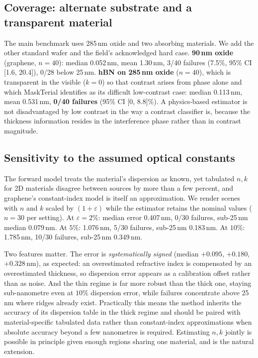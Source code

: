 \documentclass[10pt]{article}
\begin{document}
\subsection{Coverage: alternate substrate and a transparent material}\label{sec:coverage}
The main benchmark uses 285\,nm oxide and two absorbing materials. We add the other standard wafer and the field's acknowledged hard case. \textbf{90\,nm oxide} (graphene, $n{=}40$): median 0.052\,nm, mean 1.30\,nm, 3/40 failures (7.5\%, 95\% CI [1.6, 20.4]), 0/28 below 25\,nm. \textbf{hBN on 285\,nm oxide} ($n{=}40$), which is transparent in the visible ($k{=}0$) so that contrast arises from phase alone and which MaskTerial identifies as its difficult low-contrast case: median 0.113\,nm, mean 0.531\,nm, \textbf{0/40 failures} (95\% CI [0, 8.8]\%). A physics-based estimator is not disadvantaged by low contrast in the way a contrast classifier is, because the thickness information resides in the interference phase rather than in contrast magnitude.

\subsection{Sensitivity to the assumed optical constants}\label{sec:nk}
The forward model treats the material's dispersion as known, yet tabulated $n,k$ for 2D materials disagree between sources by more than a few percent, and graphene's constant-index model is itself an approximation. We render scenes with $n$ and $k$ scaled by $(1{+}\varepsilon)$ while the estimator retains the nominal values ($n{=}30$ per setting). At $\varepsilon{=}2\%$: median error 0.407\,nm, 0/30 failures, sub-25\,nm median 0.079\,nm. At $5\%$: 1.076\,nm, 5/30 failures, sub-25\,nm 0.183\,nm. At $10\%$: 1.785\,nm, 10/30 failures, sub-25\,nm 0.349\,nm.

Two features matter. The error is \emph{systematically signed} (median $+0.095$, $+0.180$, $+0.328$\,nm), as expected: an overestimated refractive index is compensated by an overestimated thickness, so dispersion error appears as a calibration offset rather than as noise. And the thin regime is far more robust than the thick one, staying sub-nanometre even at $10\%$ dispersion error, while failures concentrate above 25\,nm where ridges already exist. Practically this means the method inherits the accuracy of its dispersion table in the thick regime and should be paired with material-specific tabulated data rather than constant-index approximations when absolute accuracy beyond a few nanometres is required. Estimating $n,k$ jointly is possible in principle given enough regions sharing one material, and is the natural extension.
\end{document}
